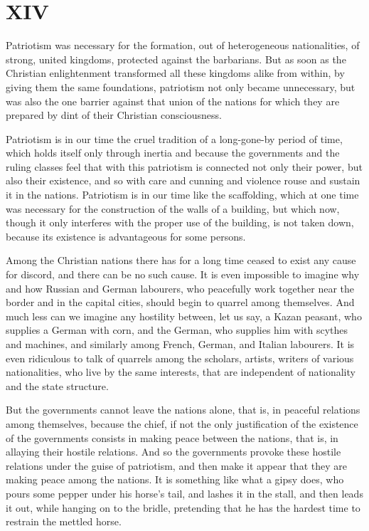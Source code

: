\documentclass{book}
\begin{document}
\chapter{XIV}
\label{chapter-14}
Patriotism was necessary for the formation, out of heterogeneous nationalities, of strong, united kingdoms, protected against the barbarians. But as soon as the Christian enlightenment transformed all these kingdoms alike from within, by giving them the same foundations, patriotism not only became unnecessary, but was also the one barrier against that union of the nations for which they are prepared by dint of their Christian consciousness.

Patriotism is in our time the cruel tradition of a long-gone-by period of time, which holds itself only through inertia and because the governments and the ruling classes feel that with this patriotism is connected not only their power, but also their existence, and so with care and cunning and violence rouse and sustain it in the nations. Patriotism is in our time like the scaffolding, which at one time was necessary for the construction of the walls of a building, but which now, though it only interferes with the proper use of the building, is not taken down, because its existence is advantageous for some persons.

Among the Christian nations there has for a long time ceased to exist any cause for discord, and there can be no such cause. It is even impossible to imagine why and how Russian and German labourers, who peacefully work together near the border and in the capital cities, should begin to quarrel among themselves. And much less can we imagine any hostility between, let us say, a Kazan peasant, who supplies a German with corn, and the German, who supplies him with scythes and machines, and similarly among French, German, and Italian labourers. It is even ridiculous to talk of quarrels among the scholars, artists, writers of various nationalities, who live by the same interests, that are independent of nationality and the state structure.

But the governments cannot leave the nations alone, that is, in peaceful relations among themselves, because the chief, if not the only justification of the existence of the governments consists in making peace between the nations, that is, in allaying their hostile relations. And so the governments provoke these hostile relations under the guise of patriotism, and then make it appear that they are making peace among the nations. It is something like what a gipsy does, who pours some pepper under his horse’s tail, and lashes it in the stall, and then leads it out, while hanging on to the bridle, pretending that he has the hardest time to restrain the mettled horse.
\end{document}
